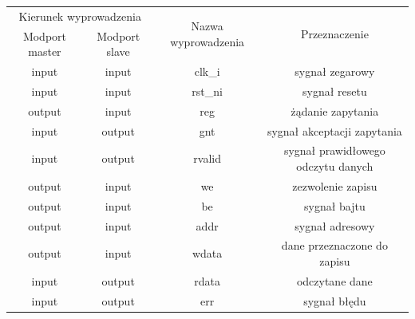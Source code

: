 \documentclass[11pt,a4paper]{article}
\begin{document}
\begin{minipage}{\textwidth}
\begin{center}
			\small
				\begin{tabular}{|c|c|c|c|}
					\hline
					\multicolumn{2}{|c|}{Kierunek wyprowadzenia} & \multirow{2}{*}{Nazwa wyprowadzenia} & \multirow{2}{*}{Przeznaczenie}\\
					\cline{1-2}
					Modport master & Modport slave & & \\ 
					\hline
					input & input & clk\_i & sygnał zegarowy \\
					\hline
					input & input & rst\_ni & sygnał resetu \\
					\hline
					output & input & reg & żądanie zapytania\\
					\hline
					input & output & gnt & sygnał akceptacji zapytania\\
					\hline
					input & output & rvalid & sygnał prawidłowego odczytu danych\\
					\hline
					output & input & we & zezwolenie zapisu\\
					\hline
					output & input & be & sygnał bajtu\\
					\hline
					output & input & addr & sygnał adresowy\\
					\hline
					output & input & wdata & dane przeznaczone do zapisu\\
					\hline
					input & output & rdata & odczytane dane\\
					\hline
					input & output & err & sygnał błędu\\
					\hline
				\end{tabular}
		\end{center}
		\end{minipage}
\end{document}
